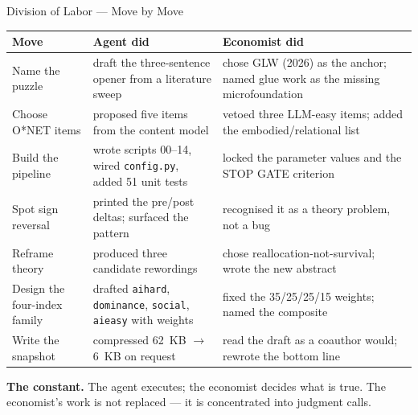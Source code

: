 \documentclass[10pt,english,aspectratio=169]{beamer}
\begin{document}
\begin{frame}{Division of Labor --- Move by Move}
\scriptsize
\begin{tabular}{p{3.1cm}p{4.2cm}p{4.7cm}}
\toprule
\textbf{Move} & \textbf{Agent did} & \textbf{Economist did} \\
\midrule
Name the puzzle & draft the three-sentence opener from a literature sweep & chose GLW (2026) as the anchor; named glue work as the missing microfoundation \\
Choose O*NET items & proposed five items from the content model & vetoed three LLM-easy items; added the embodied/relational list \\
Build the pipeline & wrote scripts 00--14, wired \texttt{config.py}, added 51 unit tests & locked the parameter values and the STOP GATE criterion \\
Spot sign reversal & printed the pre/post deltas; surfaced the pattern & recognised it as a theory problem, not a bug \\
Reframe theory & produced three candidate rewordings & chose reallocation-not-survival; wrote the new abstract \\
Design the four-index family & drafted \texttt{aihard}, \texttt{dominance}, \texttt{social}, \texttt{aieasy} with weights & fixed the 35/25/25/15 weights; named the composite \\
Write the snapshot & compressed 62~KB $\to$ 6~KB on request & read the draft as a coauthor would; rewrote the bottom line \\
\bottomrule
\end{tabular}

\vspace{0.2cm}
\textbf{The constant.} The agent executes; the economist decides what is true. The economist's work is not replaced --- it is concentrated into judgment calls.
\end{frame}
\end{document}
